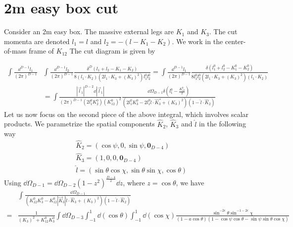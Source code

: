 \section{2m easy box cut}
Consider an 2m easy box.
The massive external legs are $K_1$ and $K_3$.
The cut momenta are denoted $l_1 = l$ and $l_2 = -( l-K_1-K_2)$.
We work in the center-of-mass frame of $K_{12}$
The cut diagram is given by

\begin{equation*}
\begin{split}
\int\frac{\dd^{D-1}l_1}{(2\pi)^{D-1}} &
 \int\frac{\dd^{D-1}l_2}{(2\pi)^{D-1}}
\frac{\delta^{D}(l_1 + l_2 - K_1- K_2)}{8(l_1\cdot K_2)(2l_1\cdot K_3 + (K_3)^2)l_1^0 l_2^0} 
 = 
\int\frac{\dd^{D-1}l_1}{(2\pi)^{D-1}} 
\frac{\delta(l_1^0 + l_2^0 - K_1^0 - K_2^0)}{8 l_1^0 l_2^0 (2l_1\cdot K_3 + (K_3)^2)(l_1\cdot K_2)}
\\
& = \int\frac{|\vec{l}_1|^{D-2} \dd |\vec{l}_1|}{(2\pi)^{D-1}(2l_1^0 K_2^0)(K_{12}^0)^2}
\frac{\dd \Omega_{D-1} \delta(l_1^0 - \frac{K^0_{12}}{2})}{(2l_1^0 K_3^0 - 2l_1^0 \hat{l}\cdot\vec{K_3} + (K_3)^2)(1-\hat{l}\cdot \hat{K}_2)}
\end{split}
\end{equation*}
Let us now focus on the second piece of the above integral, which involves scalar products. 
We parametrize the spatial components $\hat{K}_2$, $\hat{K}_3$ and $\hat{l}$ in the following way
\begin{equation*}
\begin{split}
& \hat{K}_2 = (\cos\psi, 0, \sin \psi, \mathbf{0}_{D-4})
\\
& \hat{K}_3 = (1,0,0,\mathbf{0}_{D-4})
\\
& \hat{l} = (\sin\theta\cos\chi, \sin\theta\sin\chi,\cos\theta)
\end{split}
\end{equation*}
Using $\dd\Omega_{D-1} = \dd \Omega_{D-2}(1-z^2)^{\frac{D-4}{2}}\dd z$, where $z = \cos\theta$, 
we have
\begin{equation}\label{omega11}
\begin{split}
& \int\frac{\dd \Omega_{D-1}}{(K_{12}^0 K_3^0 - K_{12}^0 |\vec{K}_3| \hat{l}\cdot \hat{K}_3 + (K_3)^2)(1-\hat{l}\cdot\hat{K}_2)}
\\
= & \frac{1}{(K_3)^2 + K_{12}^0 K_3^0}\int \dd \Omega_{D-3}
\int_{-1}^1 \dd(\cos\theta)\int_{-1}^1\dd(\cos \chi)\frac{\sin^{-2\epsilon}\theta \sin^{-1-2\epsilon}\chi}{(1-a\cos\theta)(1-\cos\psi\cos\theta  - \sin\psi\sin\theta\cos\chi)}
\end{split}
\end{equation}
